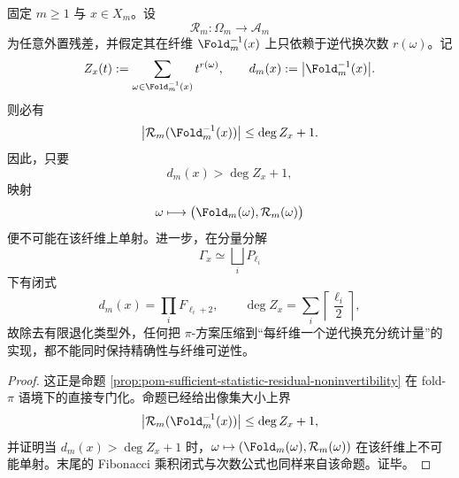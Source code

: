 \begin{theorem}[逆代换充分统计外置的纤维不可逆障碍]\label{thm:conclusion-foldgauge-pi-sufficient-statistic-fiber-obstruction}
固定 \(m\ge 1\) 与 \(x\in X_m\)。设
\[
\mathcal R_m:\Omega_m\longrightarrow \mathcal A_m
\]
为任意外置残差，并假定其在纤维 \(\Fold_m^{-1}(x)\) 上只依赖于逆代换次数 \(r(\omega)\)。记
\[
Z_x(t):=\sum_{\omega\in \Fold_m^{-1}(x)}t^{r(\omega)},
\qquad
d_m(x):=\bigl|\Fold_m^{-1}(x)\bigr|.
\]
则必有
\[
\bigl|\mathcal R_m(\Fold_m^{-1}(x))\bigr|
\le
\deg Z_x+1.
\]
因此，只要
\[
d_m(x)>\deg Z_x+1,
\]
映射
\[
\omega\longmapsto \bigl(\Fold_m(\omega),\mathcal R_m(\omega)\bigr)
\]
便不可能在该纤维上单射。进一步，在分量分解
\[
\Gamma_x\simeq\bigsqcup_i P_{\ell_i}
\]
下有闭式
\[
d_m(x)=\prod_i F_{\ell_i+2},
\qquad
\deg Z_x=\sum_i \left\lceil\frac{\ell_i}{2}\right\rceil,
\]
故除去有限退化类型外，任何把 \(\pi\)-方案压缩到“每纤维一个逆代换充分统计量”的实现，都不能同时保持精确性与纤维可逆性。
\end{theorem}
\begin{proof}
这正是命题 \ref{prop:pom-sufficient-statistic-residual-noninvertibility} 在 fold-\(\pi\) 语境下的直接专门化。命题已经给出像集大小上界
\[
\bigl|\mathcal R_m(\Fold_m^{-1}(x))\bigr|
\le
\deg Z_x+1,
\]
并证明当 \(d_m(x)>\deg Z_x+1\) 时，\(\omega\mapsto (\Fold_m(\omega),\mathcal R_m(\omega))\) 在该纤维上不可能单射。末尾的 Fibonacci 乘积闭式与次数公式也同样来自该命题。证毕。
\end{proof}

